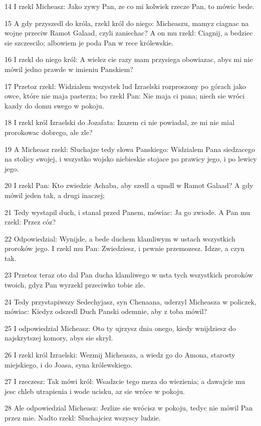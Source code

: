 \par 14 I rzekl Micheasz: Jako zywy Pan, ze co mi kolwiek rzecze Pan, to mówic bede.
\par 15 A gdy przyszedl do króla, rzekl król do niego: Micheaszu, mamyz ciagnac na wojne przeciw Ramot Galaad, czyli zaniechac? A on mu rzekl: Ciagnij, a bedziec sie szczescilo; albowiem je poda Pan w rece królewskie.
\par 16 I rzekl do niego król: A wielez cie razy mam przysiega obowiazac, abys mi nie mówil jedno prawde w imieniu Panskiem?
\par 17 Przetoz rzekl: Widzialem wszystek lud Izraelski rozproszony po górach jako owce, które nie maja pasterza; bo rzekl Pan: Nie maja ci pana; niech sie wróci kazdy do domu swego w pokoju.
\par 18 I rzekl król Izraelski do Jozafata: Izazem ci nie powiadal, ze mi nie mial prorokowac dobrego, ale zle?
\par 19 A Micheasz rzekl: Sluchajze tedy slowa Panskiego: Widzialem Pana siedzacego na stolicy swojej, i wszystko wojsko niebieskie stojace po prawicy jego, i po lewicy jego.
\par 20 I rzekl Pan: Kto zwiedzie Achaba, aby szedl a upadl w Ramot Galaad? A gdy mówil jeden tak, a drugi inaczej;
\par 21 Tedy wystapil duch, i stanal przed Panem, mówiac: Ja go zwiode. A Pan mu rzekl: Przez cóz?
\par 22 Odpowiedzial: Wynijde, a bede duchem klamliwym w ustach wszystkich proroków jego. I rzekl mu Pan: Zwiedziesz, i pewnie przemozesz. Idzze, a czyn tak.
\par 23 Przetoz teraz oto dal Pan ducha klamliwego w usta tych wszystkich proroków twoich, gdyz Pan wyrzekl przeciwko tobie zle.
\par 24 Tedy przystapiwszy Sedechyjasz, syn Chenaana, uderzyl Micheasza w policzek, mówiac: Kiedyz odszedl Duch Panski odemnie, aby z toba mówil?
\par 25 I odpowiedzial Micheasz: Oto ty ujrzysz dnia onego, kiedy wnijdziesz do najskrytszej komory, abys sie skryl.
\par 26 I rzekl król Izraelski: Wezmij Micheasza, a wiedz go do Amona, starosty miejskiego, i do Joasa, syna królewskiego.
\par 27 I rzeczesz: Tak mówi król: Wsadzcie tego meza do wiezienia; a dawajcie mu jesc chleb utrapienia i wode ucisku, az sie wróce w pokoju.
\par 28 Ale odpowiedzial Micheasz: Jezlize sie wrócisz w pokoju, tedyc nie mówil Pan przez mie. Nadto rzekl: Sluchajciez wszyscy ludzie.
